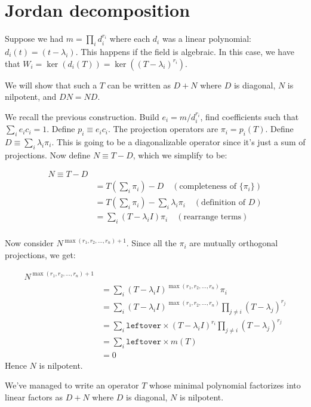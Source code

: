 \documentclass{book}
\theoremstyle{definition}
\begin{document}
\section{Jordan decomposition}
Suppose we had $m = \prod_i d_i^{r_i}$ where each
$d_i$ was a linear polynomial: $d_i(t) = (t - \lambda_i)$.
This happens if the field is algebraic. In this case, we have
that $W_i = \ker(d_i(T)) = \ker((T - \lambda_i)^{r_i})$.

We will show that such a $T$ can be written as $D + N$ where $D$ is diagonal,
$N$ is nilpotent, and $DN = ND$.

We recall the previous construction. Build $e_i = m/d_i^{r_i}$, find
coefficients such that $\sum_i e_i c_i = 1$. Define $p_i \equiv e_i c_i$. The
projection operators are $\pi_i = p_i(T)$. Define $D \equiv \sum_i \lambda_i \pi_i$.
This is going to be a diagonalizable operator since it's just a sum of
projections. Now define $N \equiv T - D$, which we simplify to be:

\begin{align*}
N \equiv T - D\\
&= T (\sum_i \pi_i) - D \quad (\text{completeness of $\{\pi_i\}$}) \\
&= T (\sum_i \pi_i) - \sum_i \lambda_i \pi_i \quad (\text{definition of $D$}) \\
&= \sum_i (T - \lambda_i I)\pi_i \quad (\text{rearrange terms}) \\
\end{align*}

Now consider $N^{\max(r_1, r_2, \dots, r_n) + 1}$. Since all the $\pi_i$ are mutually
orthogonal projections, we get:

\begin{align*}
N^{\max(r_1, r_2, \dots, r_n)+1} \\
& = \sum_i (T - \lambda_i I)^{\max(r_1, r_2, \dots, r_n)} \pi_i \\
& = \sum_i (T - \lambda_i I)^{\max(r_1, r_2, \dots, r_n)} \prod_{j \neq i} (T - \lambda_j)^{r_j} \\
& = \sum_i \texttt{leftover} \times (T - \lambda_i I)^{r_i} \prod_{j \neq i} (T - \lambda_j)^{r_j} \\
& = \sum_i \texttt{leftover} \times m(T) \\
& = 0
\end{align*}
Hence $N$ is nilpotent.

We've managed to write an operator $T$ whose minimal polynomial factorizes
into linear factors as $D + N$ where $D$ is diagonal, $N$ is nilpotent.
\end{document}
